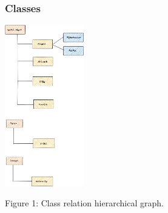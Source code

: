 \documentclass{article}
\begin{document}
\begin{center}
\subsubsection{Classes}
\newline
\newline
\includegraphics[width=130]{figure_1.png}
\newline
\caption{Figure 1: Class relation hierarchical graph.}
\end{center}
\end{document}
